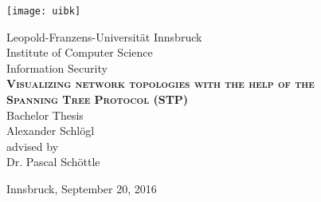\begin{titlepage}

    \begin{center}

        \texttt{[image: uibk]}

        \large Leopold-Franzens-Universit\"at Innsbruck\\
        [0.5cm]  

        \large Institute of Computer Science\\Information Security\\
        [3cm]

        \textsc{\large\textbf{Visualizing network topologies with the help of the\\
        Spanning Tree Protocol (STP)}}\\
        Bachelor Thesis\\
        [2cm]

        Alexander Schlögl\\
        [3.5cm]

        advised by\\
        Dr. Pascal Schöttle\\

        \vfill

        Innsbruck, September 20, 2016

    \end{center}

\end{titlepage}


